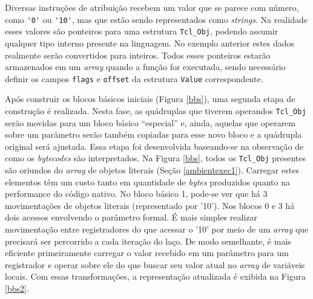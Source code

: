 Diversas instruções de atribuição recebem um
valor que se parece com número, como \verb!'0'! ou \verb!'10'!, mas
que estão sendo representados como \textit{strings}. Na realidade esses valores
são ponteiros para uma estrutura \verb!Tcl_Obj!, podendo assumir
qualquer tipo interno presente na linguagem. No exemplo anterior estes
dados realmente serão convertidos para inteiros.%
Todos esses ponteiros
estarão armazenados em um \textit{array} quando a função for executada,
sendo necessário definir os campos \verb!flags! e \verb!offset! da
estrutura \verb!Value! correspondente.

Após construir os blocos básicos iniciais (Figura \ref{bbs}), uma
segunda etapa de construção é realizada. Nesta fase, as quádruplas que
tiverem operandos \verb!Tcl_Obj! serão
movidas para um bloco básico ``especial'' e, ainda, aquelas que
operarem sobre um parâmetro serão também copiadas para esse novo bloco
e a quádrupla original será ajustada. Essa etapa foi desenvolvida
baseando-se na observação de como os
\textit{bytecodes} são interpretados. Na Figura \ref{bbs}, todos
os \verb!Tcl_Obj! presentes são oriundos do \textit{array} de objetos
literais (Seção \ref{ambientexec1}). Carregar estes elementos têm um
custo tanto em quantidade de \textit{bytes} produzidos quanto na
performance do código nativo. No bloco básico 1, pode-se ver que há 3
movimentações de objetos literais (representado por '10'). Nos blocos 0 e 3
há dois acessos envolvendo o parâmetro formal. É mais simples
realizar movimentação entre registradores do que acessar o '10'
por meio de um \textit{array} que precisará ser percorrido a cada
iteração do laço. De modo semelhante, é mais eficiente primeiramente
carregar o valor recebido em um parâmetro para um registrador e operar
sobre ele do que buscar
seu valor atual no \textit{array} de variáveis locais. Com essas
transformações, a representação atualizada é exibida na Figura \ref{bbs2}.

